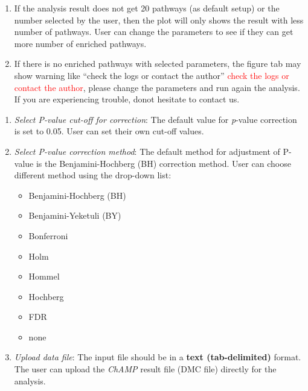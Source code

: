 \documentclass[
  a4paper,
  oneside,
  open=any]{scrreport}
\providecommand{\tightlist}{%
  \setlength{\itemsep}{0pt}\setlength{\parskip}{0pt}}\usepackage{longtable,booktabs,array}
\begin{document}
\begin{tcolorbox}[enhanced jigsaw, bottomrule=.15mm, left=2mm, coltitle=black, breakable, colback=white, arc=.35mm, rightrule=.15mm, opacitybacktitle=0.6, toptitle=1mm, leftrule=.75mm, toprule=.15mm, bottomtitle=1mm, opacityback=0, colbacktitle=quarto-callout-tip-color!10!white, titlerule=0mm, colframe=quarto-callout-tip-color-frame, title=\textcolor{quarto-callout-tip-color}{\faLightbulb}\hspace{0.5em}{Tip}]

\begin{enumerate}
\def\labelenumi{\arabic{enumi}.}
\tightlist
\item
  If the analysis result does not get 20 pathways (as default setup) or
  the number selected by the user, then the plot will only shows the
  result with less number of pathways. User can change the parameters to
  see if they can get more number of enriched pathways.
\item
  If there is no enriched pathways with selected parameters, the figure
  tab may show warning like {``check the logs or contact the author''}
  \textcolor{red}{check the logs or contact the author}, please change
  the parameters and run again the analysis. If you are experiencing
  trouble, donot hesitate to contact us.
\end{enumerate}

\end{tcolorbox}

\begin{enumerate}
\def\labelenumi{\arabic{enumi}.}
\setcounter{enumi}{3}
\item
  \emph{Select P-value cut-off for correction}: The default value for
  \emph{p}-value correction is set to 0.05. User can set their own
  cut-off values.
\item
  \emph{Select P-value correction method}: The default method for
  adjustment of P-value is the Benjamini-Hochberg (BH) correction
  method. User can choose different method using the drop-down list:

  \begin{itemize}
  \tightlist
  \item
    Benjamini-Hochberg (BH)
  \item
    Benjamini-Yeketuli (BY)
  \item
    Bonferroni
  \item
    Holm
  \item
    Hommel
  \item
    Hochberg
  \item
    FDR
  \item
    none
  \end{itemize}
\item
  \emph{Upload data file}: The input file should be in a \textbf{text
  (tab-delimited)} format. The user can upload the \emph{ChAMP} result
  file (DMC file) directly for the analysis.
\end{enumerate}
\end{document}
